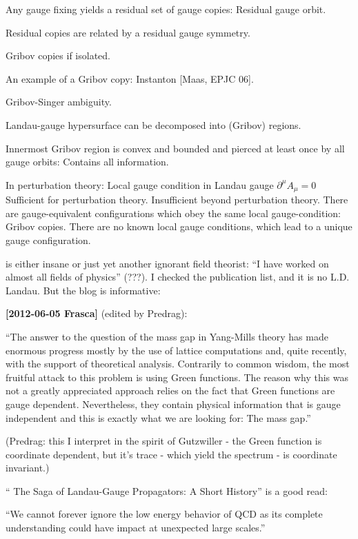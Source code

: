 \begin{description}
Any gauge fixing yields a residual set of gauge copies: Residual gauge
orbit.

Residual copies are related by a residual gauge symmetry.

Gribov copies if isolated.

An example of a Gribov copy: Instanton
[Maas, EPJC 06].

Gribov-Singer ambiguity.

Landau-gauge hypersurface can be decomposed into (Gribov) regions.

Innermost Gribov region is convex and bounded and pierced at least once
by all gauge orbits: Contains all information.

In perturbation theory: Local gauge condition in Landau gauge
$\partial^\mu A_\mu=0$
Sufficient for perturbation theory. Insufficient beyond perturbation theory.
There are gauge-equivalent configurations which obey the same
local gauge-condition: Gribov copies. There are no known local gauge conditions, which lead to a
unique gauge configuration.

\item[2012-06-14 Predrag]
 is either insane
or just yet another ignorant field theorist: ``I have worked on almost
all fields of physics'' (???). I checked the publication list, and it is
no  L.D. Landau. But the blog is informative:

{\bf [2012-06-05 Frasca]} (edited by Predrag):

``The answer to the question of the mass gap in Yang-Mills theory has
made enormous progress mostly by the use of lattice computations and,
quite recently, with the support of theoretical analysis. Contrarily to
common wisdom, the most fruitful attack to this problem is using Green
functions. The reason why this was not a greatly appreciated approach
relies on the fact that Green functions are gauge dependent.
Nevertheless, they contain physical information that is gauge independent
and this is exactly what we are looking for: The mass gap.''

(Predrag: this I interpret in the spirit of Gutzwiller - the Green function
is coordinate dependent, but it's trace - which yield the spectrum - is
coordinate invariant.)

``
{The Saga of Landau-Gauge Propagators: A Short History}'' is a good read:

``We cannot forever ignore the low energy behavior of QCD as its complete
understanding could have impact at unexpected large scales.''



\end{description}

